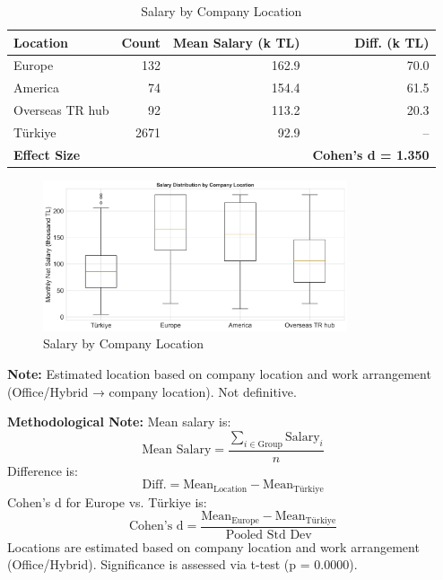 \documentclass[12pt,a4paper]{article}
\begin{document}
\begin{table}[H]
	\centering
	\small
	\begin{tabular}{lrrr}
		\toprule
		\textbf{Location}    & \textbf{Count} & \textbf{Mean Salary (k TL)} & \textbf{Diff. (k TL)}      \\
		\midrule
		Europe               & 132            & 162.9                       & 70.0                       \\
		America              & 74             & 154.4                       & 61.5                       \\
		Overseas TR hub      & 92             & 113.2                       & 20.3                       \\
		Türkiye             & 2671           & 92.9                        & --                         \\
		\midrule
		\textbf{Effect Size} &                &                             & \textbf{Cohen's d = 1.350} \\
		\bottomrule
	\end{tabular}
	\caption{Salary by Company Location}
\end{table}

\begin{figure}[H]
	\centering
	\includegraphics[width=0.8\textwidth]{figures/boxplot_company_location.png}
	\caption{Salary by Company Location}
\end{figure}
\textbf{Note:} Estimated location based on company location and work arrangement (Office/Hybrid → company location). Not definitive.

\textbf{Methodological Note:}
Mean salary is:
\[
	\text{Mean Salary} = \frac{\sum_{i \in \text{Group}} \text{Salary}_i}{n}
\]
Difference is:
\[
	\text{Diff.} = \text{Mean}_{\text{Location}} - \text{Mean}_{\text{Türkiye}}
\]
Cohen's d for Europe vs. Türkiye is:
\[
	\text{Cohen's d} = \frac{\text{Mean}_{\text{Europe}} - \text{Mean}_{\text{Türkiye}}}{\text{Pooled Std Dev}}
\]
Locations are estimated based on company location and work arrangement (Office/Hybrid). Significance is assessed via t-test (p = 0.0000).
\end{document}
